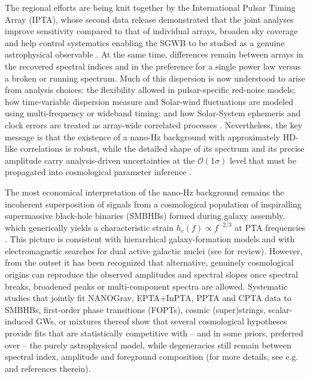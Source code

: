 \documentclass[a4paper,11pt]{article}
\begin{document}
The regional efforts are being knit together by the International Pulsar Timing Array (IPTA), 
whose second data release demonstrated that the joint analyses improve sensitivity compared 
to that of individual arrays, broaden sky coverage and help control systematics enabling 
the SGWB to be studied as a genuine astrophysical observable \citep{Antoniadis:2022yph}. 
At the same time, differences remain between arrays in the recovered spectral indices and 
in the preference for a single power law versus a broken or running spectrum. Much of this 
dispersion is now understood to arise from analysis choices: the flexibility allowed in 
pulsar-specific red-noise models; how time-variable dispersion measure and Solar-wind 
fluctuations are modeled using multi-frequency or wideband timing; and how Solar-System 
ephemeris and clock errors are treated as array-wide correlated processes
\citep{Antoniadis:2023xlr,Agazie:2023ome,Reardon:2023gzh,Xu:2023wog}. Nevertheless, 
the key message is that the existence of a nano-Hz background with approximately HD-like 
correlations is robust, while the detailed shape of its spectrum and its precise amplitude 
carry analysis-driven uncertainties at the $\mathcal{O}(1\sigma)$ level that must be propagated 
into cosmological parameter inference \citep{BurkeSpolaor:2019CQG,Taylor:2025SKAReview}.

The most economical interpretation of the nano-Hz background remains 
the incoherent superposition of signals from a cosmological population 
of inspiralling supermassive black-hole binaries (SMBHBs) formed during 
galaxy assembly, which generically yields a characteristic strain 
$h_c(f)\propto f^{-2/3}$ at PTA frequencies \citep{Phinney:2001,JaffeBacker:2003,Sesana:2008}. 
This picture is consistent with hierarchical galaxy-formation models and with
electromagnetic searches for dual active galactic nuclei (see \citep{BurkeSpolaor:2019CQG}
for review). However, from the outset it has been recognized that alternative, 
genuinely cosmological origins can reproduce the observed amplitudes and spectral 
slopes once spectral breaks, broadened peaks or multi-component spectra are allowed. 
Systematic studies that jointly fit NANOGrav, EPTA+InPTA, PPTA and CPTA data to SMBHBs,
first-order phase transitions (FOPTs), cosmic (super)strings, scalar-induced GWs, or
mixtures thereof show that several cosmological hypotheses provide fits that are
statistically competitive with -- and in some priors, preferred over -- the purely 
astrophysical model, while degeneracies still remain between spectral index, 
amplitude and foreground composition (for more details, see e.g.~\citep{Goncalves:2025uwh,Figueroa:2024pta,Wu:2023pta,Zu:2024mirror,Fujikura:2023dpt,
Gouttenoire:2023ftt,Madge:2023jhep} and references therein). 
\end{document}
